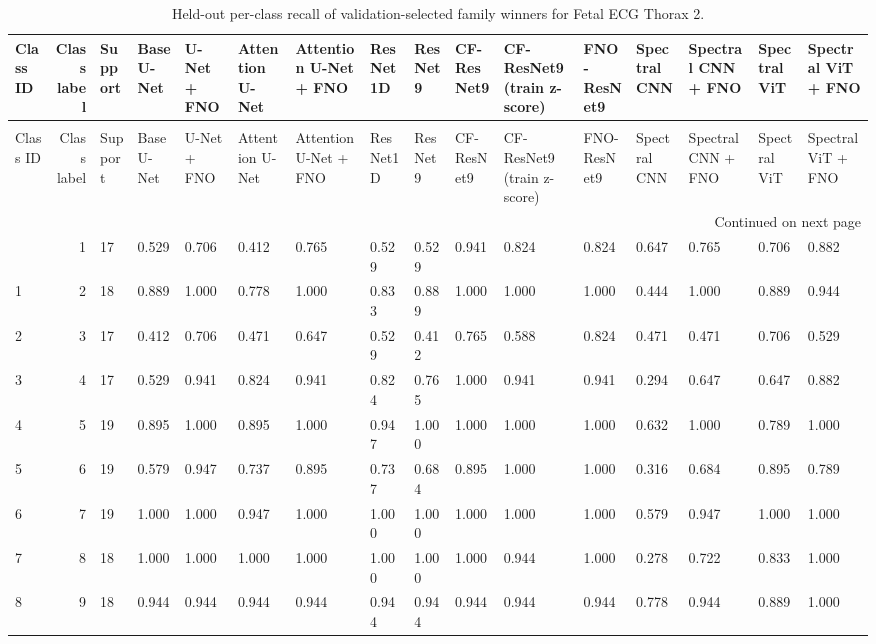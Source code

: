 \begin{longtable}{lrllllllllllllll}
\caption{Held-out per-class recall of validation-selected family winners for Fetal ECG Thorax 2.} \label{tab:noninvasivefetalecgthorax2_per_class_recall} \\
\toprule
Class ID & Class label & Support & Base U-Net & U-Net + FNO & Attention U-Net & Attention U-Net + FNO & ResNet1D & ResNet9 & CF-ResNet9 & CF-ResNet9 (train z-score) & FNO-ResNet9 & Spectral CNN & Spectral CNN + FNO & Spectral ViT & Spectral ViT + FNO \\
\midrule
\endfirsthead
\caption[]{Held-out per-class recall of validation-selected family winners for Fetal ECG Thorax 2.} \\
\toprule
Class ID & Class label & Support & Base U-Net & U-Net + FNO & Attention U-Net & Attention U-Net + FNO & ResNet1D & ResNet9 & CF-ResNet9 & CF-ResNet9 (train z-score) & FNO-ResNet9 & Spectral CNN & Spectral CNN + FNO & Spectral ViT & Spectral ViT + FNO \\
\midrule
\endhead
\midrule
\multicolumn{16}{r}{Continued on next page} \\
\midrule
\endfoot
\bottomrule
\endlastfoot
0 & 1 & 17 & 0.529 & 0.706 & 0.412 & 0.765 & 0.529 & 0.529 & 0.941 & 0.824 & 0.824 & 0.647 & 0.765 & 0.706 & 0.882 \\
1 & 2 & 18 & 0.889 & 1.000 & 0.778 & 1.000 & 0.833 & 0.889 & 1.000 & 1.000 & 1.000 & 0.444 & 1.000 & 0.889 & 0.944 \\
2 & 3 & 17 & 0.412 & 0.706 & 0.471 & 0.647 & 0.529 & 0.412 & 0.765 & 0.588 & 0.824 & 0.471 & 0.471 & 0.706 & 0.529 \\
3 & 4 & 17 & 0.529 & 0.941 & 0.824 & 0.941 & 0.824 & 0.765 & 1.000 & 0.941 & 0.941 & 0.294 & 0.647 & 0.647 & 0.882 \\
4 & 5 & 19 & 0.895 & 1.000 & 0.895 & 1.000 & 0.947 & 1.000 & 1.000 & 1.000 & 1.000 & 0.632 & 1.000 & 0.789 & 1.000 \\
5 & 6 & 19 & 0.579 & 0.947 & 0.737 & 0.895 & 0.737 & 0.684 & 0.895 & 1.000 & 1.000 & 0.316 & 0.684 & 0.895 & 0.789 \\
6 & 7 & 19 & 1.000 & 1.000 & 0.947 & 1.000 & 1.000 & 1.000 & 1.000 & 1.000 & 1.000 & 0.579 & 0.947 & 1.000 & 1.000 \\
7 & 8 & 18 & 1.000 & 1.000 & 1.000 & 1.000 & 1.000 & 1.000 & 1.000 & 0.944 & 1.000 & 0.278 & 0.722 & 0.833 & 1.000 \\
8 & 9 & 18 & 0.944 & 0.944 & 0.944 & 0.944 & 0.944 & 0.944 & 0.944 & 0.944 & 0.944 & 0.778 & 0.944 & 0.889 & 1.000 \\

\end{longtable}
